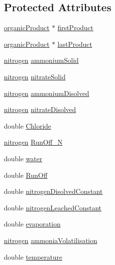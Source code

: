 \subsection*{Protected Attributes}
\begin{DoxyCompactItemize}
\item 
\hyperlink{classorganic_product}{organicProduct} $\ast$ \hyperlink{classsoil_surface_a29f5c29354eff438ba89b62583f20d59}{firstProduct}
\item 
\hyperlink{classorganic_product}{organicProduct} $\ast$ \hyperlink{classsoil_surface_afcdda156747bc4d2381838a0f2336c68}{lastProduct}
\item 
\hyperlink{classnitrogen}{nitrogen} \hyperlink{classsoil_surface_a61be813dd41dd4b2f40fefee735696ce}{ammoniumSolid}
\item 
\hyperlink{classnitrogen}{nitrogen} \hyperlink{classsoil_surface_ab566e777525777ad61c080bcfc3a8a62}{nitrateSolid}
\item 
\hyperlink{classnitrogen}{nitrogen} \hyperlink{classsoil_surface_a47c649169e56864826b72feb3bd3e027}{ammoniumDisolved}
\item 
\hyperlink{classnitrogen}{nitrogen} \hyperlink{classsoil_surface_ad273a42865ea12eba884c867538681b7}{nitrateDisolved}
\item 
double \hyperlink{classsoil_surface_a580e10604ee7303c0b980984f09ddb17}{Chloride}
\item 
\hyperlink{classnitrogen}{nitrogen} \hyperlink{classsoil_surface_aba1c7551c02a4781195e57fbd6963c2f}{RunOff\_\-N}
\item 
double \hyperlink{classsoil_surface_ad980e7ed17d0b8284082728a87f95983}{water}
\item 
double \hyperlink{classsoil_surface_ae21ef0e0798775d3f47321665ba2d47b}{RunOff}
\item 
double \hyperlink{classsoil_surface_a443e3e96045eab940fad15b2148ca310}{nitrogenDisolvedConstant}
\item 
double \hyperlink{classsoil_surface_a201a944caf9676abee3aa5a74ec34f8c}{nitrogenLeachedConstant}
\item 
double \hyperlink{classsoil_surface_aba8dbb85f3f82bcb0d7d3493855f16b0}{evaporation}
\item 
\hyperlink{classnitrogen}{nitrogen} \hyperlink{classsoil_surface_ae27aef70d693762080a42a5a8b3542b7}{ammoniaVolatilisation}
\item 
double \hyperlink{classsoil_surface_a3b9e9759bccf43a4fb6a971c0cff4874}{temperature}
\end{DoxyCompactItemize}


